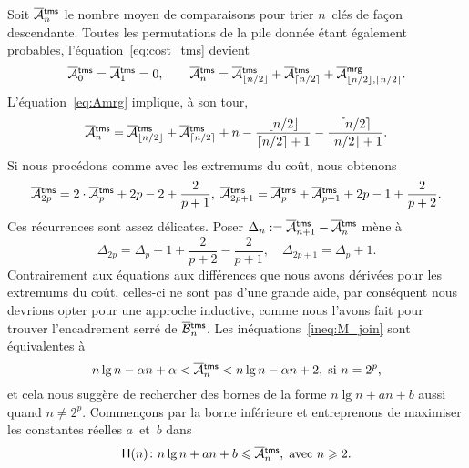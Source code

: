 
Soit \(\OM{\fun{tms}}{n}\) le nombre
moyen de comparaisons pour trier \(n\)~clés de façon
descendante. Toutes les permutations de la pile donnée étant également
probables, l'équation~\eqref{eq:cost_tms} devient
\begin{equation*}
\OM{\fun{tms}}{0} = \OM{\fun{tms}}{1} = 0,\qquad
\OM{\fun{tms}}{n} = \OM{\fun{tms}}{\floor{n/2}} +
\OM{\fun{tms}}{\ceiling{n/2}} +
\OM{\fun{mrg}}{\floor{n/2},\ceiling{n/2}}.\index{mrg@\fun{mrg/2}}
\end{equation*}
L'équation~\eqref{eq:Amrg} implique, à son tour,
\begin{equation*}
\OM{\fun{tms}}{n} = \OM{\fun{tms}}{\floor{n/2}} +
\OM{\fun{tms}}{\ceiling{n/2}} + n -
\frac{\floor{n/2}}{\ceiling{n/2}+1}
- \frac{\ceiling{n/2}}{\floor{n/2}+1}.
\end{equation*}
Si nous procédons comme avec les extremums du coût, nous obtenons
\begin{equation*}
\OM{\fun{tms}}{2p} = 2\cdot\OM{\fun{tms}}{p} + 2p - 2 +
\frac{2}{p+1},\; \OM{\fun{tms}}{2p+1} = \OM{\fun{tms}}{p} +
\OM{\fun{tms}}{p+1} + 2p - 1 + \frac{2}{p+2}.
\end{equation*}
Ces récurrences sont assez délicates. Poser \(\Delta_n :=
\OM{\fun{tms}}{n+1} - \OM{\fun{tms}}{n}\) mène à
\begin{equation*}
\Delta_{2p} = \Delta_p + 1 + \frac{2}{p+2} - \frac{2}{p+1},
\quad
\Delta_{2p+1} = \Delta_{p} + 1.
\end{equation*}
Contrairement aux équations aux différences que nous avons dérivées
pour les extremums du coût, celles-ci ne sont pas d'une grande aide,
par conséquent nous devrions opter pour une approche inductive, comme
nous l'avons fait pour trouver l'encadrement serré de
\(\OB{\fun{tms}}{n}\). Les inéquations~\eqref{ineq:M_join}
 sont équivalentes à
\begin{equation*}
  n\lg n - \alpha n +
\alpha < \OM{\fun{tms}}{n} < n\lg n - \alpha n + 2,\; \text{si \(n =
  2^p\),}
\end{equation*}
et cela nous suggère de rechercher des bornes de la forme \(n\lg n +
an + b\) aussi quand \(n \neq 2^p\). Commençons par la borne
inférieure et entreprenons de maximiser les constantes réelles
\(a\)~et~\(b\) dans
\begin{equation*}
\abovedisplayskip=0pt
\belowdisplayskip=2pt
\pred{H}{n} \colon n\lg n + an + b \leqslant \OM{\fun{tms}}{n},
\; \text{avec \(n \geqslant 2\).}
\end{equation*}
